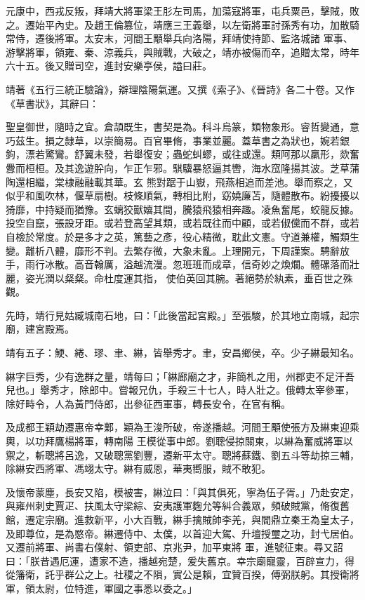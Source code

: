 \begin{pinyinscope}
 元康中，西戎反叛，拜靖大將軍梁王肜左司馬，加蕩寇將軍，屯兵粟邑，擊賊，敗之。遷始平內史。及趙王倫篡位，靖應三王義舉，以左衛將軍討孫秀有功，加散騎常侍，遷後將軍。太安末，河間王顒舉兵向洛陽，拜靖使持節、監洛城諸
 軍事、游擊將軍，領雍、秦、涼義兵，與賊戰，大破之，靖亦被傷而卒，追贈太常，時年六十五。後又贈司空，進封安樂亭侯，謚曰莊。



 靖著《五行三統正驗論》，辯理陰陽氣運。又撰《索子》、《晉詩》各二十卷。又作《草書狀》，其辭曰：



 聖皇御世，隨時之宜。倉頡既生，書契是為。科斗烏篆，類物象形。睿哲變通，意巧茲生。損之隸草，以崇簡易。百官畢脩，事業並麗。蓋草書之為狀也，婉若銀鉤，漂若驚鸞。舒翼未發，若舉復安；蟲蛇虯蟉，或往或還。類阿那以羸形，欻奮釁而桓桓。及其逸遊肸向，乍正乍邪。騏驥暴怒逼其轡，海水窊隆揚其波。芝草蒲陶還相繼，棠棣融融載其華。玄
 熊對踞于山嶽，飛燕相追而差池。舉而察之，又似乎和風吹林，偃草扇樹。枝條順氣，轉相比附，窈嬈廉苫，隨體散布。紛擾擾以猗靡，中持疑而猶豫。玄螭狡獸嬉其間，騰猿飛猿相奔趣。凌魚奮尾，蛟龍反據。投空自竄，張設牙距。或若登高望其類，或若既往而中顧，或若俶儻而不群，或若自檢於常度。於是多才之英，篤藝之彥，役心精微，耽此文憲。守道兼權，觸類生變。離析八體，靡形不判。去繁存微，大象未亂。上理開元，下周謹案。騁辭放手，雨行冰散。高音翰厲，溢越流漫。忽班班而成章，信奇妙之煥爛。體磥落而壯麗，姿光潤以粲粲。命杜度運其指，
 使伯英回其腕。著絕勢於紈素，垂百世之殊觀。



 先時，靖行見姑臧城南石地，曰：「此後當起宮殿。」至張駿，於其地立南城，起宗廟，建宮殿焉。



 靖有五子：鯁、綣、璆、聿、綝，皆舉秀才。聿，安昌鄉侯，卒。少子綝最知名。



 綝字巨秀，少有逸群之量，靖每曰；「綝廊廟之才，非簡札之用，州郡吏不足汗吾兒也。」舉秀才，除郎中。嘗報兄仇，手殺三十七人，時人壯之。俄轉太宰參軍，除好畤令，人為黃門侍郎，出參征西軍事，轉長安令，在官有稱。



 及成都王穎劫遷惠帝幸鄴，穎為王浚所破，帝遂播越。河間王顒使張方及綝東迎乘輿，以功拜鷹楊將軍，轉南陽
 王模從事中郎。劉聰侵掠關東，以綝為奮威將軍以禦之，斬聰將呂逸，又破聰黨劉豐，遷新平太守。聰將蘇鐵、劉五斗等劫掠三輔，除綝安西將軍、馮翊太守。綝有威恩，華夷嚮服，賊不敢犯。



 及懷帝蒙塵，長安又陷，模被害，綝泣曰：「與其俱死，寧為伍子胥。」乃赴安定，與雍州刺史賈疋、扶風太守梁綜、安夷護軍麴允等糾合義眾，頻破賊黨，脩復舊館，遷定宗廟。進救新平，小大百戰，綝手擒賊帥李羌，與閻鼎立秦王為皇太子，及即尊位，是為愍帝。綝遷侍中、太僕，以首迎大駕、升壇授璽之功，封弋居伯。又遷前將軍、尚書右僕射、領吏部、京兆尹，加平東將
 軍，進號征東。尋又詔曰：「朕昔遇厄運，遭家不造，播越宛楚，爰失舊京。幸宗廟寵靈，百辟宣力，得從籓衛，託乎群公之上。社稷之不隕，實公是賴，宜贊百揆，傅弼朕躬。其授衛將軍，領太尉，位特進，軍國之事悉以委之。」




\end{pinyinscope}
